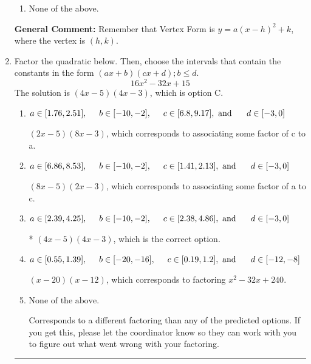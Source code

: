 \documentclass{extbook}[14pt]
\newcommand{\litem}[1]{\item #1

\rule{\textwidth}{0.4pt}}
\begin{document}
\begin{enumerate}
{\begin{enumerate}[label=\Alph*.]
\begin{multicols}{2}
\end{multicols}\item None of the above.\end{enumerate}
\textbf{General Comment:} Remember that Vertex Form is $y = a(x-h)^2+k$, where the vertex is $(h, k)$.
}
\litem{
Factor the quadratic below. Then, choose the intervals that contain the constants in the form $(ax+b)(cx+d); b \leq d.$
\[ 16x^{2} -32 x + 15 \]
The solution is \( (4x -5)(4x -3) \), which is option C.\begin{enumerate}[label=\Alph*.]
\item \( a \in [1.76, 2.51], \hspace*{5mm} b \in [-10, -2], \hspace*{5mm} c \in [6.8, 9.17], \text{ and } \hspace*{5mm} d \in [-3, 0] \)

 $(2x -5)(8x -3)$, which corresponds to associating some factor of c to a.
\item \( a \in [6.86, 8.53], \hspace*{5mm} b \in [-10, -2], \hspace*{5mm} c \in [1.41, 2.13], \text{ and } \hspace*{5mm} d \in [-3, 0] \)

 $(8x -5)(2x -3)$, which corresponds to associating some factor of a to c.
\item \( a \in [2.39, 4.25], \hspace*{5mm} b \in [-10, -2], \hspace*{5mm} c \in [2.38, 4.86], \text{ and } \hspace*{5mm} d \in [-3, 0] \)

* $(4x -5)(4x -3)$, which is the correct option.
\item \( a \in [0.55, 1.39], \hspace*{5mm} b \in [-20, -16], \hspace*{5mm} c \in [0.19, 1.2], \text{ and } \hspace*{5mm} d \in [-12, -8] \)

 $(x -20)(x -12)$, which corresponds to factoring $x^{2} -32 x + 240$.
\item \( \text{None of the above.} \)

 Corresponds to a different factoring than any of the predicted options. If you get this, please let the coordinator know so they can work with you to figure out what went wrong with your factoring.
\end{enumerate}

}
\end{enumerate}
\end{document}
